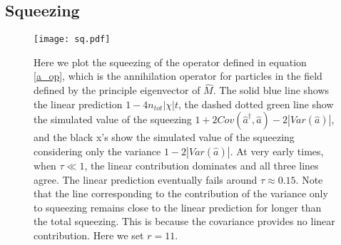\documentclass[aps,prd,twocolumn,superscriptaddress]{revtex4-1}
\begin{document}
\begin{comment}
\subsection{Mode occupation error}

Often it is important to track the ability of the MFT to track the mode occupation numbers. For example, in the case of scalar field dark matter, these correspond to densities which are a well constrained quantity \cite{Aghanim2020}. It is evident from Figure \ref{fig:qualConv} that it is possible to converge to the classical occupation numbers without converging to the classical field values themselves. 

Here we simulate coherent and field number state initial conditions. Both converge have mode occupations which converge to the classical solution. We follow the evolution of the fractional deviation of the summed mode occupations, i.e. $\delta n(t) = \sum_i^M |\braket{\hat N_i(t)} - |a^{cl}_i(t)|^2|/n_{tot}$. We define a quantum breaktime to occur when $\delta n(t^{\delta n}_{br}) \equiv 0.1$.

As with our previous definitions of the breaktime we observe an approximate logarithmic enhancement in the breaktime as a function of the total particle number, as shown by the red lines in Figure \ref{fig:params}. Again, there is good agreement between the breaktime defined in this way and the previous methods, indicating our results are robust to the specific definition of the breaktime.  
\end{comment}

\subsection{Squeezing}

\begin{figure}
	\texttt{[image: sq.pdf]}
	\caption{ Here we plot the squeezing of the operator defined in equation \eqref{a_op}, which is the annihilation operator for particles in the field defined by the principle eigenvector of $\hat M$. The solid blue line shows the linear prediction $1 - 4 n_{tot} |\chi| t$, the dashed dotted green line show the simulated value of the squeezing $1 + 2 Cov(\hat a^\dagger, \hat a) - 2|Var(\hat a)|$, and the black x's show the simulated value of the squeezing considering only the variance $1 - 2|Var(\hat a)|$. At very early times, when $\tau \ll 1$, the linear contribution dominates and all three lines agree. The linear prediction eventually fails around $\tau \approx 0.15$. Note that the line corresponding to the contribution of the variance only to squeezing remains close to the linear prediction for longer than the total squeezing. This is because the covariance provides no linear contribution. Here we set $r=11$. }
	\label{fig:sq}
\end{figure}
\end{document}
